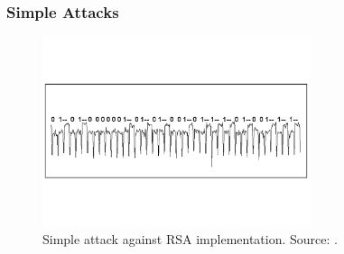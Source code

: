 \subsubsection{Simple Attacks}\label{sec:simple}
\begin{figure}
\centering
\includegraphics[width=0.7\textwidth]{../Figures/SPA_SM_kocher_2011.pdf} 
\caption{Simple attack against RSA implementation. Source: \cite{kocher2011introduction}.}\label{fig:SPA}
\end{figure}

